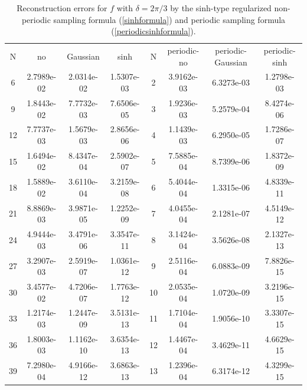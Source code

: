\documentclass[a4paper]{article}
\numberwithin{equation}{section}
\begin{document}
\begin{table}[h]
\centering
\caption{Reconstruction errors for $f$ with $\delta = 2\pi/3$ by the sinh-type regularized non-periodic sampling formula (\ref{sinhformula}) and  periodic sampling formula (\ref{periodicsinhformula}). }
\label{tab:4pi6}
\begin{tabular}{c c c c c c c c}
\toprule
{N} & {no} & {Gaussian} & {sinh} &{N} & {periodic-no}& {periodic-Gaussian} & {periodic-sinh} \\
\cmidrule(lr){2-4} \cmidrule(lr){6-8}
6  & 2.7989e-02 & 2.0314e-02 & 1.5307e-03 & 2  & 3.9162e-03 & 6.3273e-03 & 1.2798e-03 \\
9  & 1.8443e-02 & 7.7732e-03 & 7.6506e-05 & 3  & 1.9236e-03 & 5.2579e-04 & 8.4274e-06 \\
12 & 7.7737e-03 & 1.5679e-03 & 2.8656e-06 & 4  & 1.1439e-03 & 6.2950e-05 & 1.7286e-07 \\
15 & 1.6494e-02 & 8.4347e-04 & 2.5902e-07 & 5  & 7.5885e-04 & 8.7399e-06 & 1.8372e-09 \\
18 & 1.5889e-02 & 3.6110e-04 & 3.2159e-08 & 6  & 5.4044e-04 & 1.3315e-06 & 4.8339e-11 \\
21 & 8.8869e-03 & 3.9871e-05 & 1.2252e-09 & 7  & 4.0455e-04 & 2.1281e-07 & 4.5149e-12 \\
24 & 4.9444e-03 & 3.4791e-06 & 3.3547e-11 & 8  & 3.1424e-04 & 3.5626e-08 & 2.1327e-13 \\
27 & 3.2907e-03 & 2.5919e-07 & 1.0361e-12 & 9  & 2.5116e-04 & 6.0883e-09 & 7.8826e-15 \\
30 & 3.4577e-02 & 4.7206e-07 & 1.7763e-12 & 10 & 2.0535e-04 & 1.0720e-09 & 3.2196e-15 \\
33 & 1.2174e-03 & 1.2447e-09 & 3.5131e-13 & 11 & 1.7104e-04 & 1.9056e-10 & 3.3307e-15 \\
36 & 1.8003e-03 & 1.1162e-10 & 3.6354e-13 & 12 & 1.4467e-04 & 3.4629e-11 & 4.6629e-15 \\
39 & 7.2980e-04 & 4.9166e-12 & 3.6863e-13 & 13 & 1.2396e-04 & 6.3174e-12 & 4.3299e-15 \\
\bottomrule
\end{tabular}

\end{table}
\end{document}
